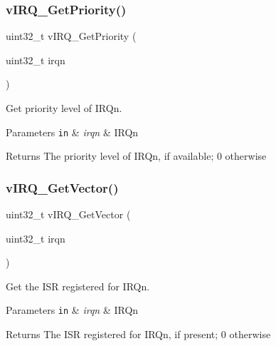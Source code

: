 \subsubsection{\texorpdfstring{v\+I\+R\+Q\+\_\+\+Get\+Priority()}{vIRQ\_GetPriority()}}
{\footnotesize\ttfamily uint32\+\_\+t v\+I\+R\+Q\+\_\+\+Get\+Priority (\begin{DoxyParamCaption}\item[{uint32\+\_\+t}]{irqn }\end{DoxyParamCaption})}



Get priority level of I\+R\+Qn.


\begin{DoxyParams}[1]{Parameters}
\mbox{\tt in}  & {\em irqn} & I\+R\+Qn\\
\hline
\end{DoxyParams}
\begin{DoxyReturn}{Returns}
The priority level of I\+R\+Qn, if available; 0 otherwise
\end{DoxyReturn}
\hypertarget{group__hypervisor_gaaa9c852e90077dd4c553240d769b3658}{}\label{group__hypervisor_gaaa9c852e90077dd4c553240d769b3658}
\subsubsection{\texorpdfstring{v\+I\+R\+Q\+\_\+\+Get\+Vector()}{vIRQ\_GetVector()}}
{\footnotesize\ttfamily uint32\+\_\+t v\+I\+R\+Q\+\_\+\+Get\+Vector (\begin{DoxyParamCaption}\item[{uint32\+\_\+t}]{irqn }\end{DoxyParamCaption})}



Get the I\+SR registered for I\+R\+Qn.


\begin{DoxyParams}[1]{Parameters}
\mbox{\tt in}  & {\em irqn} & I\+R\+Qn\\
\hline
\end{DoxyParams}
\begin{DoxyReturn}{Returns}
The I\+SR registered for I\+R\+Qn, if present; 0 otherwise
\end{DoxyReturn}
\hypertarget{group__hypervisor_gab5570c2fa5a04a3a183cdef960a43c6b}{}\label{group__hypervisor_gab5570c2fa5a04a3a183cdef960a43c6b}
